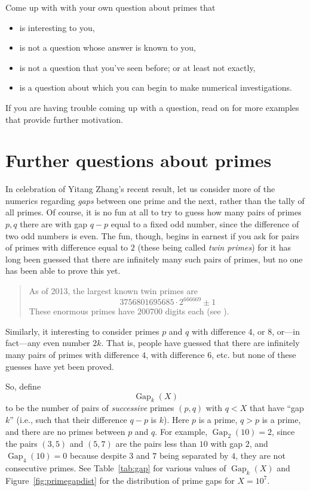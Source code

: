 \documentclass[openany]{book}
\DeclareMathOperator{\Gap}{Gap}
\theoremstyle{plain}
\theoremstyle{definition}
\begin{document}
Come up with with your own question about primes that
 \begin{itemize}
 \item     is interesting to you,
  \item    is not a question whose answer is known to you,
 \item     is not a question that you've seen before; or at least not exactly,
  \item    is a question about which you can begin to make numerical investigations.
 \end{itemize}
If you are having trouble coming up with a question, read on for more
examples that  provide further motivation.

\chapter{Further questions about primes\label{ch:further}}

In celebration of Yitang Zhang's recent result, let us consider more of the numerics
regarding {\em gaps} between one prime and the next, rather than the tally
of all primes. Of course, it is no fun at all to try to guess how many
pairs of primes $p, q$ there are with gap $q-p$ equal to a fixed odd
number, since the difference of two odd numbers is even.  The fun,
though, begins in earnest if you ask for pairs of primes with
difference equal to $2$ (these being called {\em twin primes}) for it
has long been guessed that there are infinitely many such pairs of
primes, but no one has been able to prove this yet.

\begin{quote} As of 2013, the largest known twin primes are
$$3756801695685\cdot 2^{666669} \pm 1$$
These enormous primes have $200700$ digits each (see ).
\end{quote}


Similarly, it interesting to consider primes $p$ and $q$
with difference $4$, or $8$, or---in fact---any even number
$2k$. That is, people have guessed that there are infinitely many
pairs of primes with difference $4$, with difference $6$, etc. but
none of these guesses have yet been proved.





So, define
$$
  \Gap_{k}(X)
$$
to be the number of pairs of {\em successive} primes $(p,q)$ with
$q<X$ that have ``gap $k$'' (i.e., such that their difference $q-p$ is
$k$).  Here $p$ is a prime, $q>p$ is a prime, and there are no primes
between $p$ and $q$.  For example, $\Gap_2(10) = 2$, since the pairs
$(3,5)$ and $(5,7)$ are the pairs less than $10$ with gap $2$,
and $\Gap_{4}(10)=0$ because despite $3$ and $7$ being separated
by $4$, they are not consecutive primes.
See Table~\ref{tab:gap} for various values of $\Gap_{k}(X)$ and
Figure~\ref{fig:primegapdist} for the distribution of prime gaps for
$X=10^7$.
\end{document}
